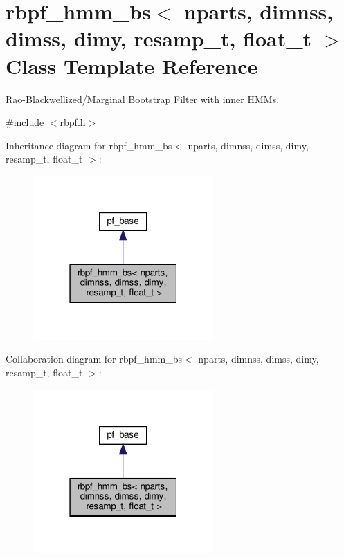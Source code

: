 \hypertarget{classrbpf__hmm__bs}{}\section{rbpf\+\_\+hmm\+\_\+bs$<$ nparts, dimnss, dimss, dimy, resamp\+\_\+t, float\+\_\+t $>$ Class Template Reference}
\label{classrbpf__hmm__bs}


Rao-\/\+Blackwellized/\+Marginal Bootstrap Filter with inner H\+M\+Ms.  




{\ttfamily \#include $<$rbpf.\+h$>$}



Inheritance diagram for rbpf\+\_\+hmm\+\_\+bs$<$ nparts, dimnss, dimss, dimy, resamp\+\_\+t, float\+\_\+t $>$\+:
\nopagebreak
\begin{figure}[H]
\begin{center}
\leavevmode
\includegraphics[width=195pt]{classrbpf__hmm__bs__inherit__graph}
\end{center}
\end{figure}


Collaboration diagram for rbpf\+\_\+hmm\+\_\+bs$<$ nparts, dimnss, dimss, dimy, resamp\+\_\+t, float\+\_\+t $>$\+:
\nopagebreak
\begin{figure}[H]
\begin{center}
\leavevmode
\includegraphics[width=195pt]{classrbpf__hmm__bs__coll__graph}
\end{center}
\end{figure}
